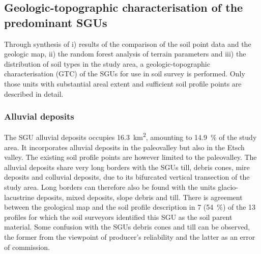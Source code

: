 \documentclass[preprint,12pt,authoryear]{elsarticle}
\begin{document}
\subsection{Geologic-topographic characterisation of the predominant SGUs}
Through synthesis of i) results of the comparison of the soil point data and the geologic map, ii) the random forest analysis of terrain parameters and iii) the distribution of soil types in the study area, a geologic-topographic characterisation (GTC) of the  SGUs for use in soil survey is performed. Only those units with substantial areal extent and sufficient soil profile points are described in detail.

\subsubsection{Alluvial deposits}
The SGU alluvial deposits occupies 16.3~km\textsuperscript{2}, amounting to 14.9~\% of the study area. It incorporates alluvial deposits in the paleovalley but also in the Etsch valley. The existing soil profile points are however limited to the paleovalley. The alluvial deposits share very long borders with the SGUs till, debris cones, mire deposits and colluvial deposits, due to its bifurcated vertical transection of the study area. Long borders can therefore also be found with the units glacio-lacustrine deposits, mixed deposits, slope debris and till. There is agreement between the geological map and the soil profile description in 7 (54~\%) of the 13 profiles for which the soil surveyors identified this SGU as the soil parent material. Some confusion with the SGUs debris cones and till can be observed, the former from the viewpoint of producer's reliability and the latter as an error of commission.  
\end{document}
